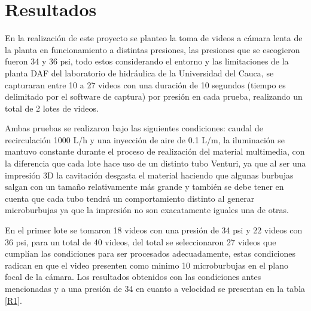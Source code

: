 \documentclass[12pt,twocolumn,a4paper]{article}
\begin{document}
\section{Resultados}

En la realización de este proyecto se planteo la toma de videos a cámara lenta de la planta en funcionamiento a distintas presiones, las presiones que se escogieron fueron 34 y 36 psi, todo estos considerando el entorno y las limitaciones de la planta DAF del laboratorio de hidráulica de la Universidad del Cauca, se capturaran entre 10 a 27 videos con una duración de 10 segundos (tiempo es delimitado por el software de captura) por presión en cada prueba, realizando un total de 2 lotes de videos.

Ambas pruebas se realizaron bajo las siguientes condiciones: caudal de recirculación 1000 L/h y una inyección de aire de 0.1 L/m, la iluminación se mantuvo constante durante el proceso de realización del material multimedia, con la diferencia que cada lote hace uso de un distinto tubo Venturi, ya que al ser una impresión 3D la cavitación desgasta el material haciendo que algunas burbujas salgan con un tamaño relativamente más grande y también se debe tener en cuenta que cada tubo tendrá un comportamiento distinto al generar microburbujas ya que la impresión no son exacatamente iguales una de otras. 

En el primer lote se tomaron 18 videos con una presión de 34 psi y 22 videos con 36 psi, para un total de 40 videos, del total se seleccionaron 27 videos que cumplían las condiciones para ser procesados adecuadamente, estas condiciones radican en que el video presenten como minimo 10 microburbujas en el plano focal de la cámara. Los resultados obtenidos con las condiciones antes mencionadas y a una presión de 34  en cuanto a velocidad se presentan en la tabla \ref{R1}.
\end{document}

